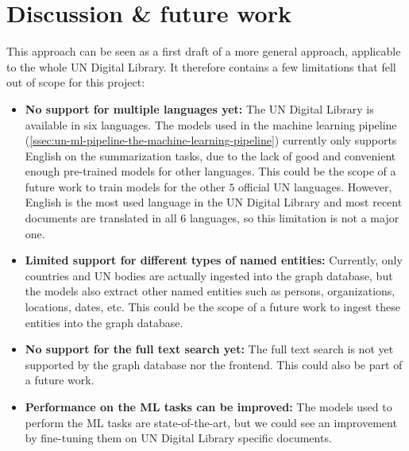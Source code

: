 
\section{Discussion \& future work} \label{sec:discussion-future-work}



This approach can be seen as a first draft of a more general approach, applicable to the whole UN Digital Library. It therefore contains a few limitations that fell out of scope for this project:


\begin{itemize}
    \item \textbf{No support for multiple languages yet:} The UN Digital Library is available in six languages. The models used in the machine learning pipeline (\ref{ssec:un-ml-pipeline-the-machine-learning-pipeline}) currently only supports English on the summarization tasks, due to the lack of good and convenient enough pre-trained models for other languages. This could be the scope of a future work to train models for the other $5$ official UN languages. However, English is the most used language in the UN Digital Library and most recent documents are translated in all $6$ languages, so this limitation is not a major one.

    \item \textbf{Limited support for different types of named entities:} Currently, only countries and UN bodies are actually ingested into the graph database, but the models also extract other named entities such as persons, organizations, locations, dates, etc. This could be the scope of a future work to ingest these entities into the graph database.

    \item \textbf{No support for the full text search yet:} The full text search is not yet supported by the graph database nor the frontend. This could also be part of a future work.

    \item \textbf{Performance on the ML tasks can be improved:} The models used to perform the ML tasks are state-of-the-art, but we could see an improvement by fine-tuning them on UN Digital Library specific documents.


\end{itemize}
